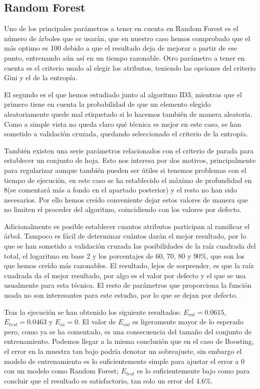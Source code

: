 \documentclass{article}
\begin{document}
	\subsection{Random Forest}
	Uno de los principales parámetros a tener en cuenta en Random Forest es el número de árboles que se usarán, que en nuestro caso hemos comprobado que el más optimo es 100 debido a que el resultado deja de mejorar a partir de ese punto, entrenando aún así en un tiempo razonable. Otro parámetro a tener en cuenta es el criterio usado al elegir los atributos, teniendo las opciones del criterio Gini y el de la entropía.
	\par
	El segundo es el que hemos estudiado junto al algoritmo ID3, mientras que el primero tiene en cuenta la probabilidad de que un elemento elegido aleatoriamente quede mal etiquetado si lo hacemos también de manera aleatoria. Como a simple vista no queda claro qué técnica es mejor en este caso, se han sometido a validación cruzada, quedando seleccionado el criterio de la entropía.
	\par
	También existen una serie parámetros relacionados con el criterio de parada para establecer un conjunto de hoja. Esto nos interesa por dos motivos, principalmente para regularizar aunque también pueden ser útiles si tenemos problemas con el tiempo de ejecución, en este caso se ha establecido el máximo de profundidad en 8(se comentará más a fondo en el apartado posterior) y el resto no han sido necesarios. Por ello hemos creído conveniente dejar estos valores de manera que no limiten el proceder del algoritmo, coincidiendo con los valores por defecto.
	\par
	Adicionalmente es posible establecer cuantos atributos participan al ramificar el árbol. Tampoco es fácil de determinar cuántos darán el mejor resultado, por lo que se han sometido a validación cruzada las posibilidades de la raíz cuadrada del total, el logaritmo en base 2 y los porcentajes de 60, 70, 80 y 90\%, que son los que hemos creído más razonables. El resultado, lejos de sorprender, es que la raíz cuadrada da el mejor resultado, por algo es el valor por defecto y el que se usa usualmente para esta técnica. El resto de parámetros que proporciona la función usada no son interesantes para este estudio, por lo que se dejan por defecto.
	\par
	Tras la ejecución se han obtenido los siguiente resultados: $E_{val} = 0.0615$, $E_{test} = 0.0463$ y $E_{in} = 0$. El valor de $E_{val}$ es ligeramente mayor de lo esperado pero, como ya se ha comentado, es una consecuencia del tamaño del conjunto de entrenamiento. Podemos llegar a la misma conclusión que en el caso de Boosting, el error en la muestra tan bajo podría denotar un sobreajuste, sin embargo el modelo de entrenamiento es lo suficientemente simple para ajustar el error a 0 con un modelo como Random Forest; $E_{test}$ es lo suficientemente bajo como para concluir que el resultado es satisfactorio, tan solo un error del 4.6\%.
	
\end{document}
